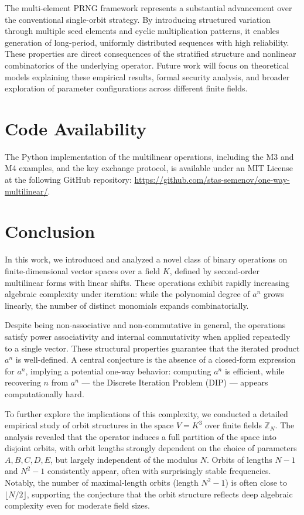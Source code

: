 \documentclass[12pt]{article}
\theoremstyle{definition}
\theoremstyle{plain}
\theoremstyle{remark}
\begin{document}
The multi-element PRNG framework represents a substantial advancement over the conventional single-orbit strategy. By introducing structured variation through multiple seed elements and cyclic multiplication patterns, it enables generation of long-period, uniformly distributed sequences with high reliability. These properties are direct consequences of the stratified structure and nonlinear combinatorics of the underlying operator. Future work will focus on theoretical models explaining these empirical results, formal security analysis, and broader exploration of parameter configurations across different finite fields.


\section*{Code Availability}
The Python implementation of the multilinear operations, including the M3 and M4 examples, and the key exchange protocol, is available under an MIT License at the following GitHub repository: \url{https://github.com/stas-semenov/one-way-multilinear/}.

\section*{Conclusion}

In this work, we introduced and analyzed a novel class of binary operations on finite-dimensional vector spaces over a field \( K \), defined by second-order multilinear forms with linear shifts. These operations exhibit rapidly increasing algebraic complexity under iteration: while the polynomial degree of \( a^n \) grows linearly, the number of distinct monomials expands combinatorially.

Despite being non-associative and non-commutative in general, the operations satisfy power associativity and internal commutativity when applied repeatedly to a single vector. These structural properties guarantee that the iterated product \( a^n \) is well-defined. A central conjecture is the absence of a closed-form expression for \( a^n \), implying a potential one-way behavior: computing \( a^n \) is efficient, while recovering \( n \) from \( a^n \) — the Discrete Iteration Problem (DIP) — appears computationally hard.

To further explore the implications of this complexity, we conducted a detailed empirical study of orbit structures in the space \( V = K^3 \) over finite fields \( \mathbb{Z}_N \). The analysis revealed that the operator induces a full partition of the space into disjoint orbits, with orbit lengths strongly dependent on the choice of parameters \( A, B, C, D, E \), but largely independent of the modulus \( N \). Orbits of lengths \( N - 1 \) and \( N^2 - 1 \) consistently appear, often with surprisingly stable frequencies. Notably, the number of maximal-length orbits (length \( N^2 - 1 \)) is often close to \( \lfloor N/2 \rfloor \), supporting the conjecture that the orbit structure reflects deep algebraic complexity even for moderate field sizes.
\end{document}
